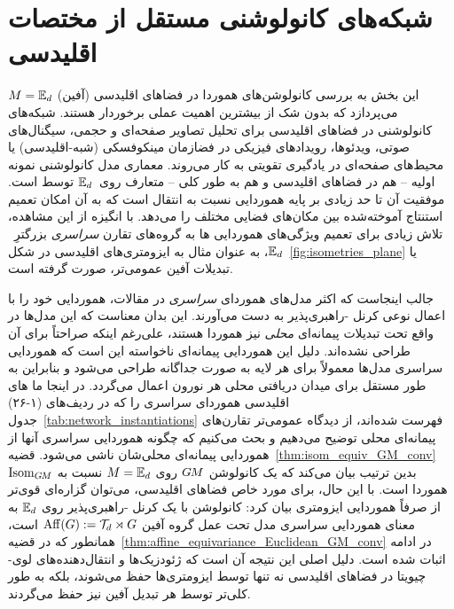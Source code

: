 

\section{شبکه‌های کانولوشنی مستقل از مختصات اقلیدسی}
\label{sec:instantiations_euclidean}

این بخش به بررسی کانولوشن‌های هموردا در فضاهای اقلیدسی (آفین) $M = \mathbb{E}_d$ می‌پردازد که بدون شک از بیشترین اهمیت عملی برخوردار هستند.
شبکه‌های کانولوشنی در فضاهای اقلیدسی برای تحلیل تصاویر صفحه‌ای و حجمی، سیگنال‌های صوتی، ویدئوها، رویدادهای فیزیکی در فضازمان مینکوفسکی (شبه-اقلیدسی) یا محیط‌های صفحه‌ای در یادگیری تقویتی به کار می‌روند.
معماری مدل کانولوشنی نمونه اولیه -- هم در فضاهای اقلیدسی و هم به طور کلی -- \CNN متعارف روی~$\mathbb{E}_d$ توسط \citet{LeCun1990CNNs} است.
موفقیت آن تا حد زیادی بر پایه هموردایی نسبت به انتقال است که به آن امکان تعمیم استنتاج آموخته‌شده بین مکان‌های فضایی مختلف را می‌دهد.
با انگیزه از این مشاهده، تلاش زیادی برای تعمیم ویژگی‌های هموردایی \CNN ها به گروه‌های تقارن \emph{سراسری} بزرگترِ~$\mathbb{E}_d$، به عنوان مثال به ایزومتری‌های اقلیدسی در شکل~\ref{fig:isometries_plane} یا تبدیلات آفین عمومی‌تر، صورت گرفته است.


جالب اینجاست که اکثر مدل‌های هموردای \emph{سراسری} در مقالات، هموردایی خود را با اعمال نوعی کرنل -راهبری‌پذیر به دست می‌آورند.
این بدان معناست که این مدل‌ها در واقع تحت تبدیلات پیمانه‌ای \emph{محلی} نیز هموردا هستند، علی‌رغم اینکه صراحتاً برای آن طراحی نشده‌اند.
دلیل این هموردایی پیمانه‌ای ناخواسته این است که هموردایی سراسری مدل‌ها معمولاً برای هر لایه به صورت جداگانه طراحی می‌شود و بنابراین به طور مستقل برای میدان دریافتی محلی هر نورون اعمال می‌گردد.
در اینجا ما \CNN های اقلیدسی هموردای سراسری را که در ردیف‌های (۱-۲۶) جدول~\ref{tab:network_instantiations} فهرست شده‌اند، از دیدگاه عمومی‌تر تقارن‌های پیمانه‌ای محلی توضیح می‌دهیم و بحث می‌کنیم که چگونه هموردایی سراسری آنها از هموردایی پیمانه‌ای محلی‌شان ناشی می‌شود.
قضیه~\ref{thm:isom_equiv_GM_conv} بدین ترتیب بیان می‌کند که یک کانولوشن $G\mkern-1.4muM$ روی $M = \mathbb{E}_d$ نسبت به $\operatorname{Isom}_{G\mkern-1.4muM}$ هموردا است.
با این حال، برای مورد خاص فضاهای اقلیدسی، می‌توان گزاره‌ای قوی‌تر از صرفاً هموردایی ایزومتری بیان کرد:
کانولوشن با یک کرنل -راهبری‌پذیر روی $\mathbb{E}_d$ به معنای هموردایی سراسری مدل تحت عمل گروه آفین $\operatorname{Aff}(G) := \mathcal{T}_d \rtimes G$ است، همانطور که در قضیه~\ref{thm:affine_equivariance_Euclidean_GM_conv} در ادامه اثبات شده است.
دلیل اصلی این نتیجه آن است که ژئودزیک‌ها و انتقال‌دهنده‌های لوی-چیویتا در فضاهای اقلیدسی نه تنها توسط ایزومتری‌ها حفظ می‌شوند، بلکه به طور کلی‌تر توسط هر تبدیل آفین نیز حفظ می‌گردند.

